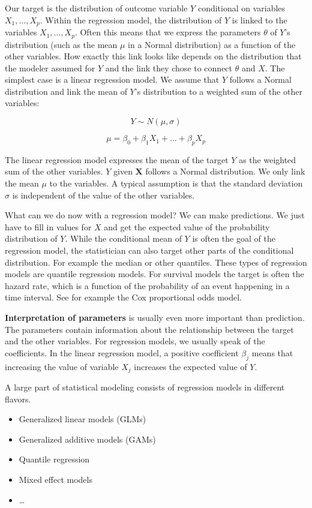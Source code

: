 \documentclass[
  10pt,
]{scrbook}
\providecommand{\tightlist}{%
  \setlength{\itemsep}{0pt}\setlength{\parskip}{0pt}}
\begin{document}
Our target is the distribution of outcome variable \(Y\) conditional on variables \(X_1, \ldots, X_p\).
Within the regression model, the distribution of \(Y\) is linked to the variables \(X_1, \ldots, X_p\).
Often this means that we express the parameters \(\theta\) of \(Y\)'s distribution (such as the mean \(\mu\) in a Normal distribution) as a function of the other variables.
How exactly this link looks like depends on the distribution that the modeler assumed for \(Y\) and the link they chose to connect \(\theta\) and \(X\).
The simplest case is a linear regression model.
We assume that \(Y\) follows a Normal distribution and link the mean of \(Y\)'s distribution to a weighted sum of the other variables:

\[Y \sim N(\mu, \sigma)\]

\[\mu = \beta_0 + \beta_1 X_1 + \ldots + \beta_p X_p\]

The linear regression model expresses the mean of the target \(Y\) as the weighted sum of the other variables.
\(Y\) given \(\mathbf{X}\) follows a Normal distribution.
We only link the mean \(\mu\) to the variables.
A typical assumption is that the standard deviation \(\sigma\) is independent of the value of the other variables.

What can we do now with a regression model?
We can make predictions.
We just have to fill in values for \(X\) and get the expected value of the probability distribution of \(Y\).
While the conditional mean of \(Y\) is often the goal of the regression model, the statistician can also target other parts of the conditional distribution.
For example the median or other quantiles.
These types of regression models are quantile regression models.
For survival models the target is often the hazard rate, which is a function of the probability of an event happening in a time interval.
See for example the Cox proportional odds model.

\textbf{Interpretation of parameters} is usually even more important than prediction.
The parameters contain information about the relationship between the target and the other variables.
For regression models, we usually speak of the coefficients.
In the linear regression model, a positive coefficient \(\beta_j\) means that increasing the value of variable \(X_j\) increases the expected value of \(Y\).

A large part of statistical modeling consists of regression models in different flavors.

\begin{itemize}
\tightlist
\item
  Generalized linear models (GLMs)
\item
  Generalized additive models (GAMs)
\item
  Quantile regression
\item
  Mixed effect models
\item
  \ldots{}
\end{itemize}
\end{document}
